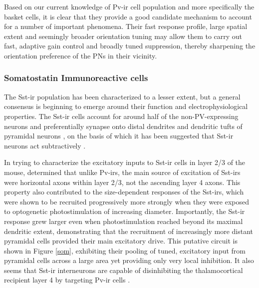 Based on our current knowledge of Pv-ir cell population and more
specifically the basket cells, it is clear that they provide a good
candidate mechanism to account for a number of important
phenomena. Their fast response profile, large spatial extent and
seemingly broader orientation tuning may allow them to carry out fast,
adaptive gain control and broadly tuned suppression, thereby
sharpening the orientation preference of the PNs in their vicinity.

\subsubsection*{Somatostatin Immunoreactive cells}

The Sst-ir population has been characterized to a lesser extent, but a
general consensus is beginning to emerge around their function and
electrophysiological properties. The Sst-ir cells account for around
half of the non-PV-expressing neurons \citep{Gonchar2007,Xu2010} and
preferentially synapse onto distal dendrites and dendritic tufts of
pyramidal neurons \citep{DiCristo2004,Silberberg2007}, on the basis of
which it has been suggested that Sst-ir neurons act subtractively
\citep{Wilson2012}.

In trying to characterize the excitatory inputs to Sst-ir cells in
layer 2/3 of the mouse, \cite{Xu2009} determined that unlike Pv-irs,
the main source of excitation of Sst-irs were horizontal axons within
layer 2/3, not the ascending layer 4 axons. This property also
contributed to the size-dependent responses of the Sst-irs, which were
shown to be recruited progressively more strongly when they were
exposed to optogenetic photostimulation of increasing
diameter. Importantly, the Sst-ir response grew larger even when
photostimulation reached beyond its maximal dendritic extent,
demonstrating that the recruitment of increasingly more distant
pyramidal cells provided their main excitatory drive. This putative
circuit is shown in Figure \ref{som}, exhibiting their pooling of
tuned, excitatory input from pyramidal cells across a large area
yet providing only very local inhibition. It also seems that
Sst-ir interneurons are capable of disinhibiting the thalamocortical
recipient layer 4 by targeting Pv-ir cells \citep{Xu2013}.

